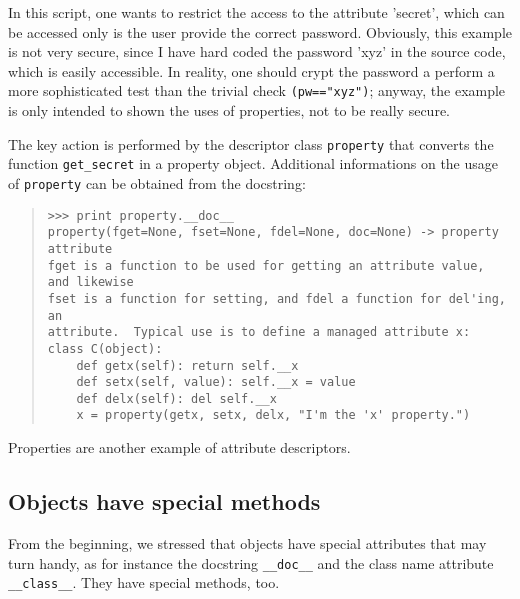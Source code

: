 \documentclass[10pt,english]{article}
\begin{document}
In this script, one wants to restrict the access to the attribute
'secret', which can be accessed only is the user provide the
correct password. Obviously, this example is not very secure,
since I have hard coded the password 'xyz' in the source code,
which is easily accessible. In reality, one should crypt the
password a perform a more sophisticated test than the trivial
check \texttt{(pw=="xyz")}; anyway, the example is only intended to
shown the uses of properties, not to be really secure.

The key action is performed by the descriptor class \texttt{property} that
converts the function \texttt{get{\_}secret} in a property object. Additional
informations on the usage of \texttt{property} can be obtained from the
docstring:
\begin{quote}
\begin{verbatim}>>> print property.__doc__
property(fget=None, fset=None, fdel=None, doc=None) -> property attribute
fget is a function to be used for getting an attribute value, and likewise
fset is a function for setting, and fdel a function for del'ing, an
attribute.  Typical use is to define a managed attribute x:
class C(object):
    def getx(self): return self.__x
    def setx(self, value): self.__x = value
    def delx(self): del self.__x
    x = property(getx, setx, delx, "I'm the 'x' property.")\end{verbatim}
\end{quote}

Properties are another example of attribute descriptors.



\hypertarget{objects-have-special-methods}{}
\subsection*{Objects have special methods}

From the beginning, we stressed that objects have special attributes that
may turn handy, as for instance the docstring \texttt{{\_}{\_}doc{\_}{\_}} and the class
name attribute \texttt{{\_}{\_}class{\_}{\_}}. They have special methods, too.
\end{document}
